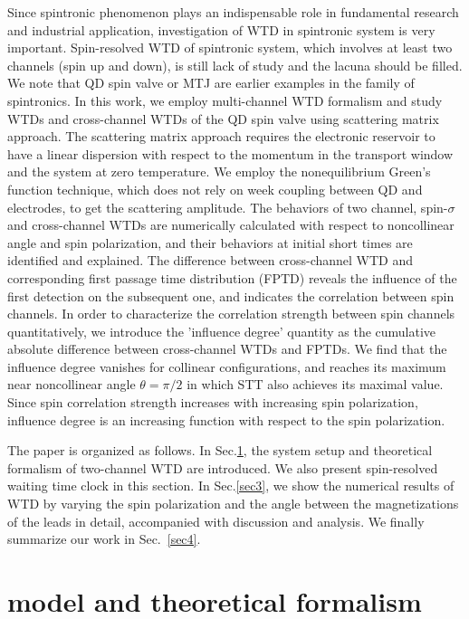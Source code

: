 \documentclass[aps,prb,twocolumn,footinbib,showpacs,superscriptaddress,preprintnumbers,amsmath,amssymb]{revtex4-1}
\begin{document}
Since spintronic phenomenon plays an indispensable role in fundamental research and industrial application, investigation of WTD in spintronic system is very important.
	Spin-resolved WTD of spintronic system, which involves at least two channels (spin up and down), is still lack of study and the lacuna should be filled.
We note that QD spin valve or MTJ are earlier examples in the family of spintronics. In this work, we employ multi-channel WTD formalism and study WTDs and cross-channel WTDs of the QD spin valve using scattering matrix approach. The scattering matrix approach requires the electronic reservoir to have a linear dispersion with respect to the momentum in the transport window and the system at zero temperature. We employ the nonequilibrium Green's function technique, which does not rely on week coupling between QD and electrodes, to get the scattering amplitude. The behaviors of two channel, spin-$\sigma$ and cross-channel WTDs are numerically calculated with respect to noncollinear  angle and spin polarization, and their behaviors at initial short times are identified and explained. 
The difference between cross-channel WTD and corresponding first passage time distribution (FPTD) reveals the influence of the first detection on the subsequent one, and indicates the correlation between spin channels. In order to characterize the correlation strength between spin channels quantitatively, we introduce the 'influence degree' quantity as the cumulative absolute difference between cross-channel WTDs and FPTDs. We find that the influence degree vanishes for collinear configurations, and reaches its maximum near noncollinear angle $\theta =\pi/2$ in which STT also achieves its maximal value. Since spin correlation strength increases with increasing spin polarization, influence degree is an increasing function with respect to the spin polarization.


	The paper is organized as follows. In Sec.\ref{sec2}, the system setup and theoretical formalism of two-channel WTD are introduced. We also present spin-resolved waiting time clock in this section. In Sec.\ref{sec3}, we show the numerical results of WTD  by varying the spin polarization and the angle between the magnetizations of the leads in detail, accompanied with discussion and analysis. We finally summarize our work in Sec.~\ref{sec4}.


\section{model and theoretical formalism}\label{sec2}
\end{document}
